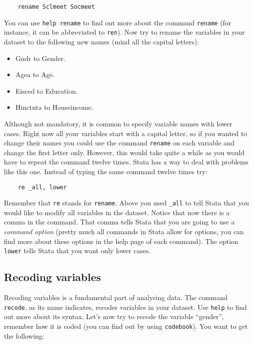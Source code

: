 \begin{lstlisting}
	rename Sclmeet Socmeet
\end{lstlisting}

You can use \texttt{help rename} to find out more about the command \texttt{rename} (for instance, it can be abbreviated to \texttt{ren}). Now try to rename the variables in your dataset to the following new names (mind all the capital letters):

\begin{itemize}
	\item Gndr to Gender.
	\item Agea to Age.
	\item Eisced to Education.
	\item Hinctnta to Houseincome.
\end{itemize}

Although not mandatory, it is common to specify variable names with lower cases. Right now all your variables start with a capital letter, so if you wanted to change their names you could use the command \texttt{rename} on each variable and change the first letter only. However, this would take quite a while as you would have to repeat the command twelve times. Stata has a way to deal with problems like this one. Instead of typing the same command twelve times try:

\begin{lstlisting}
	re _all, lower
\end{lstlisting}

Remember that \texttt{re} stands for \texttt{rename}. Above you used \texttt{\_all} to tell Stata that you would like to modify all variables in the dataset. Notice that now there is a comma in the command. That comma tells Stata that you are going to use a \textit{command option} (pretty much all commands in Stata allow for options, you can find more about these options in the help page of each command). The option \texttt{lower} tells Stata that you want only lower cases.

\subsection*{Recoding variables}

Recoding variables is a fundamental part of analysing data. The command \texttt{recode}, as its name indicates, recodes variables in your dataset. Use \texttt{help} to find out more about its syntax. Let's now try to recode the variable ``gender'', remember how it is coded (you can find out by using \texttt{codebook}). You want to get the following:

